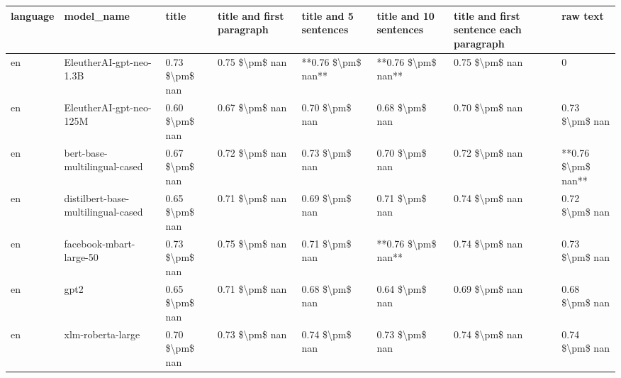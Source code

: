 \begin{tabular}{llllllll}
\toprule
language &                         model\_name &          title & title and first paragraph & title and 5 sentences & title and 10 sentences & title and first sentence each paragraph &           raw text \\
\midrule
      en &            EleutherAI-gpt-neo-1.3B & 0.73 \$\textbackslash pm\$ nan &            0.75 \$\textbackslash pm\$ nan &    **0.76 \$\textbackslash pm\$ nan** &     **0.76 \$\textbackslash pm\$ nan** &                          0.75 \$\textbackslash pm\$ nan &                  0 \\
      en &            EleutherAI-gpt-neo-125M & 0.60 \$\textbackslash pm\$ nan &            0.67 \$\textbackslash pm\$ nan &        0.70 \$\textbackslash pm\$ nan &         0.68 \$\textbackslash pm\$ nan &                          0.70 \$\textbackslash pm\$ nan &     0.73 \$\textbackslash pm\$ nan \\
      en &       bert-base-multilingual-cased & 0.67 \$\textbackslash pm\$ nan &            0.72 \$\textbackslash pm\$ nan &        0.73 \$\textbackslash pm\$ nan &         0.70 \$\textbackslash pm\$ nan &                          0.72 \$\textbackslash pm\$ nan & **0.76 \$\textbackslash pm\$ nan** \\
      en & distilbert-base-multilingual-cased & 0.65 \$\textbackslash pm\$ nan &            0.71 \$\textbackslash pm\$ nan &        0.69 \$\textbackslash pm\$ nan &         0.71 \$\textbackslash pm\$ nan &                          0.74 \$\textbackslash pm\$ nan &     0.72 \$\textbackslash pm\$ nan \\
      en &            facebook-mbart-large-50 & 0.73 \$\textbackslash pm\$ nan &            0.75 \$\textbackslash pm\$ nan &        0.71 \$\textbackslash pm\$ nan &     **0.76 \$\textbackslash pm\$ nan** &                          0.74 \$\textbackslash pm\$ nan &     0.73 \$\textbackslash pm\$ nan \\
      en &                               gpt2 & 0.65 \$\textbackslash pm\$ nan &            0.71 \$\textbackslash pm\$ nan &        0.68 \$\textbackslash pm\$ nan &         0.64 \$\textbackslash pm\$ nan &                          0.69 \$\textbackslash pm\$ nan &     0.68 \$\textbackslash pm\$ nan \\
      en &                  xlm-roberta-large & 0.70 \$\textbackslash pm\$ nan &            0.73 \$\textbackslash pm\$ nan &        0.74 \$\textbackslash pm\$ nan &         0.73 \$\textbackslash pm\$ nan &                          0.74 \$\textbackslash pm\$ nan &     0.74 \$\textbackslash pm\$ nan \\

\end{tabular}
